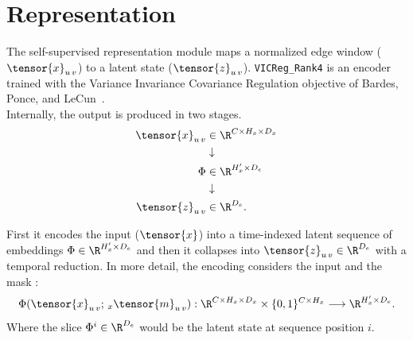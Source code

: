 \newpage{}
\section{Representation}
\label{sec:representation}

The self-supervised representation module maps a normalized edge window 
($\tensor{x}_{u\,v}$) to a latent state ($\tensor{z}_{u\,v}$). 
\texttt{VICReg\_Rank4}%
is an encoder trained with the Variance Invariance Covariance Regulation objective of
Bardes, Ponce, and LeCun~\cite{bardes2022vicreg}.\\


Internally, the output is produced in two stages. 
\[
\begin{aligned}
  \tensor{x}_{u\,v}
  &\in \R^{C \times H_x \times D_x} \\
  &\downarrow \\
  \Phi &\in \R^{H_x' \times D_e} \\
  &\downarrow \\
  \tensor{z}_{u\,v} &\in \R^{D_e}.
\end{aligned}
\]


First it encodes the input ($\tensor{x}$) into a time-indexed latent sequence of embeddings 
$\Phi \in \R^{H_x' \times D_e}$ 
and then it collapses into $\tensor{z}_{u\,v} \in \R^{D_e}$ with a temporal reduction. 
In more detail, the encoding considers the input and the mask%
: 
\[
  \Phi(\tensor{x}_{u\,v};\,{}_{x}\tensor{m}_{u\,v}) :
  \R^{C \times H_x \times D_x}
  \times
  \{0,1\}^{C \times H_x}
  \longrightarrow
  \R^{H_x' \times D_e}.\\
\]
Where the slice $\Phi^{i} \in \R^{D_e}$ would be the latent state at sequence position $i$. \\

